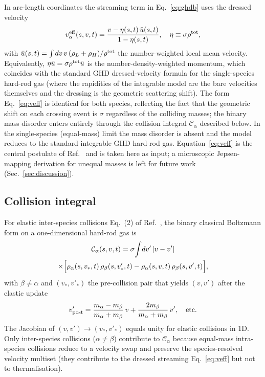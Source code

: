 \documentclass[aps,pre,twocolumn,superscriptaddress,longbibliography,floatfix]{revtex4-2}
\begin{document}
In arc-length coordinates the streaming term in
Eq.~\eqref{eq:ghdb} uses the dressed velocity
\begin{equation}
v^{\rm eff}_\alpha(s,v,t) =
\frac{v - \eta(s,t)\,\bar u(s,t)}{1 - \eta(s,t)},
\quad\eta\equiv\sigma\rho^{\rm tot},
\label{eq:veff}
\end{equation}
with $\bar u(s,t) = \int dv\,v\,(\rho_L+\rho_H)/\rho^{\rm tot}$
the number-weighted local mean velocity. Equivalently,
$\eta\bar u = \sigma\rho^{\rm tot}\bar u$ is the
number-density-weighted momentum, which coincides with the
standard GHD dressed-velocity formula for the single-species
hard-rod gas \cite{DoyonSpohn2017} (where the rapidities
of the integrable model are the bare velocities themselves
and the dressing is the geometric scattering shift). The
form Eq.~\eqref{eq:veff} is identical for both species,
reflecting the fact that the geometric shift on each crossing
event is $\sigma$ regardless of the colliding masses; the
binary mass disorder enters entirely through the collision
integral $\mathcal{C}_\alpha$ described below. In the
single-species (equal-mass) limit the mass disorder is
absent and the model reduces to the standard integrable
GHD hard-rod gas. Equation~\eqref{eq:veff} is the
central postulate of Ref.~\cite{PaperIV} and is taken here
as input; a microscopic Jepsen-mapping derivation for
unequal masses is left for future work
(Sec.~\ref{sec:discussion}).

\subsection{Collision integral}

For elastic inter-species collisions Eq.~(2) of
Ref.~\cite{PaperIV}, the binary classical Boltzmann form on a
one-dimensional hard-rod gas is
\begin{multline}
\mathcal{C}_\alpha(s,v,t) = \sigma\!\int\!dv'\,|v-v'|\\
\times\Bigl[\rho_\alpha(s,v_*,t)\,\rho_\beta(s,v'_*,t)
           -\rho_\alpha(s,v,t)\,\rho_\beta(s,v',t)\Bigr],
\label{eq:Calpha}
\end{multline}
with $\beta\neq\alpha$ and $(v_*,v'_*)$ the pre-collision pair
that yields $(v,v')$ after the elastic update
\begin{equation}
v'_{\rm post} = \frac{m_\alpha - m_\beta}{m_\alpha + m_\beta}\,v
   + \frac{2 m_\beta}{m_\alpha + m_\beta}\,v',
\quad\text{etc.}
\label{eq:elcoll}
\end{equation}
The Jacobian of $(v,v')\to(v_*,v'_*)$ equals unity for elastic
collisions in 1D. Only inter-species collisions
($\alpha\neq\beta$) contribute to $\mathcal{C}_\alpha$ because
equal-mass intra-species collisions reduce to a velocity swap
and preserve the species-resolved velocity multiset (they
contribute to the dressed streaming Eq.~\eqref{eq:veff} but not
to thermalisation).
\end{document}
